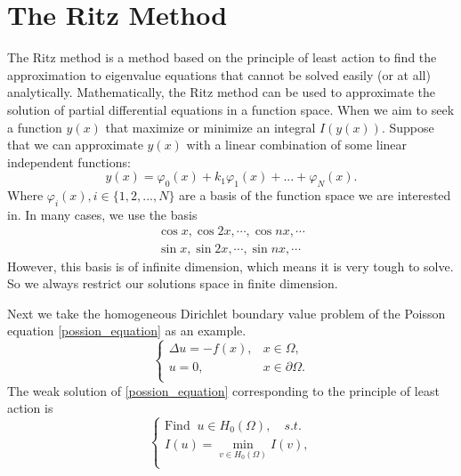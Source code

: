 \documentclass{article}
\begin{document}
\section{The Ritz Method}  %
\par The Ritz method \cite{evans1998partial} is a method based on the principle of least action to find the approximation to eigenvalue equations that cannot be solved easily (or at all) analytically. Mathematically, the Ritz method can be used to approximate the solution of partial differential equations in a function space. When we aim to seek a function $y(x)$ that maximize or minimize an integral $I(y(x))$. Suppose that we can approximate $y(x)$ with a linear combination of some linear independent functions:
\begin{equation}
	y(x)=\varphi_0(x)+k_1\varphi_1(x)+...+\varphi_N(x).
\end{equation}
Where $\varphi_{i}(x),i\in\{1,2,...,N\}$ are a basis of the function space we are interested in. In many cases, we use the basis 
\begin{equation}
	\begin{aligned}
		\cos x, \cos 2x, \cdots, \cos nx, \cdots\\
		\sin x, \sin 2x, \cdots, \sin nx, \cdots
	\end{aligned}
\end{equation}
However, this basis is of infinite dimension, which means it is very tough to solve. So we always restrict our solutions space in finite dimension.
\par Next we take the homogeneous Dirichlet boundary value problem of the Poisson equation \eqref{possion_equation} as an example.
\begin{equation}\label{possion_equation}
	\begin{cases}
 		\Delta u=-f(x), & x\in \Omega, \\
 		u=0, & x\in \partial \Omega. \\
 	\end{cases}
\end{equation}
The weak solution of \eqref{possion_equation} corresponding to the principle of least action is
\begin{equation}\label{variational problem}
	\begin{cases}
 		\text{Find }\ u\in H_{0}(\Omega),\quad s.t.\\
 		I(u)=\min\limits_{v\in H_{0}(\Omega)} I(v),\\
  	\end{cases}
\end{equation}
\end{document}

